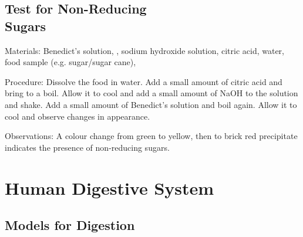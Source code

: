 \begin{multicols}{2}
\subsection{Test for Non-Reducing \hfill \\ Sugars}


\begin{description*}
\item[Materials:]{Benedict's solution, , sodium hydroxide solution, citric acid, water, food sample (e.g. sugar/sugar cane), }
\item[Procedure:]{Dissolve the food in water. Add a small amount of citric acid and bring to a boil. Allow it to cool and add a small amount of NaOH to the solution and shake. Add a small amount of Benedict's solution and boil again. Allow it to cool and observe changes in appearance.}
\item[Observations:]{A colour change from green to yellow, then to brick red precipitate indicates the presence of non-reducing sugars.}
\end{description*}

\columnbreak


\section*{Human Digestive System}


\subsection{Models for Digestion} %


\end{multicols}
